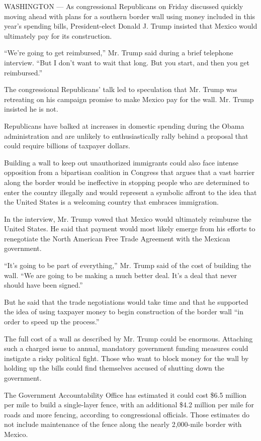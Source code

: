 WASHINGTON --- As congressional Republicans on Friday discussed quickly
moving ahead with plans for a southern border wall using money included
in this year's spending bills, President-elect Donald J. Trump insisted
that Mexico would ultimately pay for its construction.

``We're going to get reimbursed,'' Mr. Trump said during a brief
telephone interview. ``But I don't want to wait that long. But you
start, and then you get reimbursed.''

The congressional Republicans' talk led to speculation that Mr. Trump
was retreating on his campaign promise to make Mexico pay for the wall.
Mr. Trump insisted he is not.

Republicans have balked at increases in domestic spending during the
Obama administration and are unlikely to enthusiastically rally behind a
proposal that could require billions of taxpayer dollars.

Building a wall to keep out unauthorized immigrants could also face
intense opposition from a bipartisan coalition in Congress that argues
that a vast barrier along the border would be ineffective in stopping
people who are determined to enter the country illegally and would
represent a symbolic affront to the idea that the United States is a
welcoming country that embraces immigration.

In the interview, Mr. Trump vowed that Mexico would ultimately reimburse
the United States. He said that payment would most likely emerge from
his efforts to renegotiate the North American Free Trade Agreement with
the Mexican government.

``It's going to be part of everything,'' Mr. Trump said of the cost of
building the wall. ``We are going to be making a much better deal. It's
a deal that never should have been signed.''

But he said that the trade negotiations would take time and that he
supported the idea of using taxpayer money to begin construction of the
border wall ``in order to speed up the process.''

The full cost of a wall as described by Mr. Trump could be enormous.
Attaching such a charged issue to annual, mandatory government funding
measures could instigate a risky political fight. Those who want to
block money for the wall by holding up the bills could find themselves
accused of shutting down the government.

The Government Accountability Office has estimated it could cost \$6.5
million per mile to build a single-layer fence, with an additional \$4.2
million per mile for roads and more fencing, according to congressional
officials. Those estimates do not include maintenance of the fence along
the nearly 2,000-mile border with Mexico.

